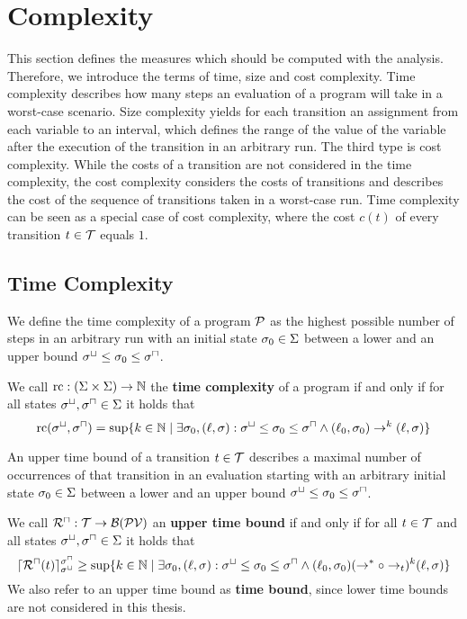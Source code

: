 \section{Complexity}

This section defines the measures which should be computed with the analysis.
Therefore, we introduce the terms of time, size and cost complexity.
Time complexity describes how many steps an evaluation of a program will take in a worst-case scenario.
Size complexity yields for each transition an assignment from each variable to an interval, which defines the range of the value of the variable after the execution of the transition in an arbitrary run.
The third type is cost complexity.
While the costs of a transition are not considered in the time complexity, the cost complexity considers the costs of transitions and describes the cost of the sequence of transitions taken in a worst-case run.
Time complexity can be seen as a special case of cost complexity, where the cost $c(t)$ of every transition $t \in \mathcal{T}$ equals $1$.

\subsection{Time Complexity}

We define the time complexity of a program $\mathcal{P}$ as the highest possible number of steps in an arbitrary run with an initial state $\sigma_0 \in \Sigma$ between a lower and an upper bound ${\sigma^\sqcup} \leq \sigma_0 \leq {\sigma^\sqcap}$.

\begin{definition}
  We call $\text{rc}: (\Sigma \times \Sigma) \rightarrow \mathbb{N}$ the \textbf{time complexity} of a program if and only if for all states ${\sigma^\sqcup}, {\sigma^\sqcap} \in \Sigma$ it holds that
  \[ \text{rc}({\sigma^\sqcup}, {\sigma^\sqcap}) = \sup \lbrace  k \in \mathbb{N} \mid \exists \sigma_0, (\ell, \sigma): {\sigma^\sqcup} \leq \sigma_0 \leq {\sigma^\sqcap} \wedge (\ell_0, \sigma_0) \rightarrow^k (\ell, \sigma)  \rbrace \]
\end{definition}

An upper time bound of a transition $t \in \mathcal{T}$ describes a maximal number of occurrences of that transition in an evaluation starting with an arbitrary initial state $\sigma_0 \in \Sigma$ between a lower and an upper bound ${\sigma^\sqcup} \leq \sigma_0 \leq {\sigma^\sqcap}$.

\begin{definition}
  We call ${\mathcal{R}^\sqcap}: \mathcal{T} \rightarrow \mathcal{B}(\mathcal{PV})$ an \textbf{upper time bound} if and only if for all $t \in \mathcal{T}$ and all states ${\sigma^\sqcup}, {\sigma^\sqcap} \in \Sigma$ it holds that
  \[ \lceil {\mathcal{R}^\sqcap}(t) \rceil^{{\sigma^\sqcap}}_{{\sigma^\sqcup}} \geq \sup \lbrace  k \in \mathbb{N} \mid \exists \sigma_0, (\ell, \sigma): {\sigma^\sqcup} \leq \sigma_0 \leq {\sigma^\sqcap} \wedge (\ell_0, \sigma_0) (\rightarrow^* \circ \rightarrow_t)^k (\ell, \sigma)  \rbrace \]
  We also refer to an upper time bound as \textbf{time bound}, since lower time bounds are not considered in this thesis.
\end{definition}

